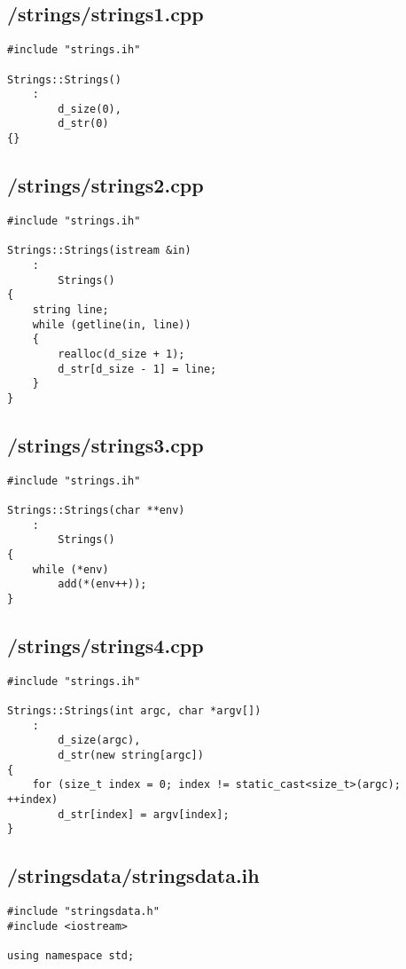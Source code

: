 \documentclass{article}
\begin{document}
\subsection*{/strings/strings1.cpp}
\begin{verbatim}
#include "strings.ih"

Strings::Strings()
    :
        d_size(0),
        d_str(0)
{}

\end{verbatim}
\subsection*{/strings/strings2.cpp}
\begin{verbatim}
#include "strings.ih"

Strings::Strings(istream &in)
    :
        Strings()
{
    string line;
    while (getline(in, line))
    {
        realloc(d_size + 1);
        d_str[d_size - 1] = line;
    }
}
\end{verbatim}
\subsection*{/strings/strings3.cpp}
\begin{verbatim}
#include "strings.ih"

Strings::Strings(char **env)
    :
        Strings()
{
    while (*env)
        add(*(env++));
}
\end{verbatim}
\subsection*{/strings/strings4.cpp}
\begin{verbatim}
#include "strings.ih"

Strings::Strings(int argc, char *argv[])
    :
        d_size(argc),
        d_str(new string[argc])
{
    for (size_t index = 0; index != static_cast<size_t>(argc); ++index)
        d_str[index] = argv[index];
}
\end{verbatim}

\subsection*{/stringsdata/stringsdata.ih}
\begin{verbatim}
#include "stringsdata.h"
#include <iostream>

using namespace std;

\end{verbatim}
\end{document}
